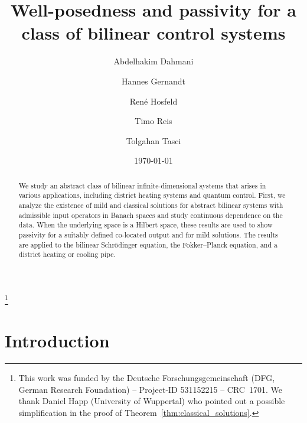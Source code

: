 \documentclass{cocv}
\theoremstyle{definition}
\begin{document}
\title{Well-posedness and passivity for a class of bilinear control systems}\thanks{This work was funded by the Deutsche Forschungsgemeinschaft (DFG, German
Research Foundation) – Project-ID 531152215 – CRC~1701. We thank Daniel Happ (University of Wuppertal) who pointed out a possible simplification in the proof of Theorem~\ref{thm:classical_solutions}.}%
%
\author{Abdelhakim Dahmani}\address{Port-Hamiltonian Institute, Bergische Universität Wuppertal, Gaußstraße 20, 42119 Wuppertal, Germany}
\author{Hannes Gernandt}\address{Port-Hamiltonian Institute, Bergische Universität Wuppertal, Gaußstraße 20, 42119 Wuppertal, Germany and Fraunhofer-Einrichtung für Energieinfrastrukturen und Geotechnologien (IEG), Gulbener Straße 23, 03046 Cottbus, Germany}
\author{René Hosfeld}\address{TU Berlin, Fasanenstraße 89,
10623 Berlin, Germany}
\author{Timo Reis}\address{TU Ilmenau, Weimarer Straße 25, 98693 Ilmenau, Germany}
\author{Tolgahan Tasci}\address{Port-Hamiltonian Institute, Bergische Universität Wuppertal, Gaußstraße 20, 42119 Wuppertal, Germany}
%
\date{\today}
%
\begin{abstract} 
We study an abstract class of bilinear infinite-dimensional systems that arises
in various applications, including district heating systems and quantum control.
First, we analyze the existence of mild and classical solutions for abstract
bilinear systems with admissible input operators in Banach spaces and study
continuous dependence on the data. When the underlying space is a Hilbert space,
these results are used to show passivity for a suitably defined co-located output
and for mild solutions. The results are applied to the bilinear Schr\"odinger
equation, the Fokker--Planck equation, and a district heating or cooling pipe.
\end{abstract}
%
%
%
%
\maketitle
\section{Introduction}
\end{document}
